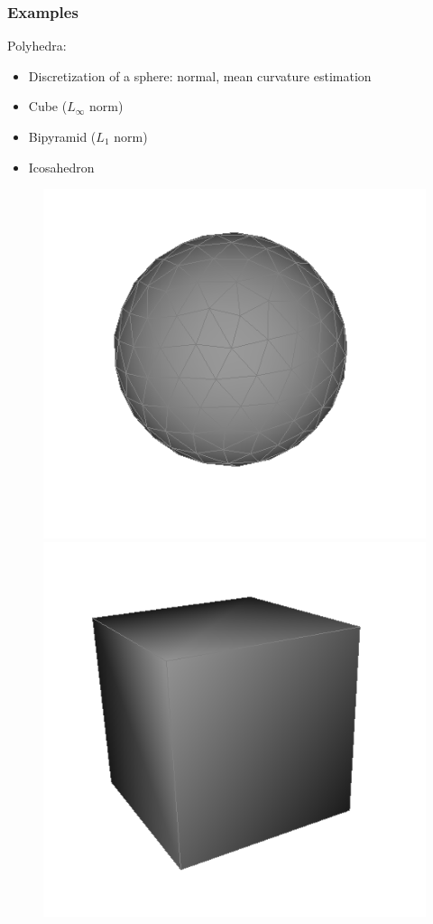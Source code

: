 \documentclass{beamer}
\begin{document}
\begin{frame}
    \frametitle{Examples}

    Polyhedra:
    \begin{itemize}
        \item Discretization of a sphere: normal, mean curvature estimation
        \item Cube ($ L_{\infty} $ norm)
        \item Bipyramid ($ L_1 $ norm)
        \item Icosahedron
    \end{itemize}

    \begin{figure}
        \centering
        \includegraphics[scale=0.2]{img/sphere-polyhedron-200}
        \includegraphics[scale=0.2]{img/cube}

\end{figure}
\end{frame}
\end{document}

